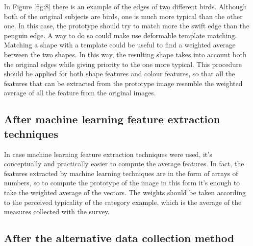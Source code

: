\documentclass[conference]{IEEEtran}
\begin{document}
		\noindent In Figure \ref{fig:8} there is an example of the edges of two different birds. Although both of the original 
		subjects are birds, one is much more typical than the other one. In this case, the prototype should try to match more the swift edge than the penguin edge. A way to do so could make use deformable 
		template matching. Matching a shape with a template could be useful to find a weighted average between the two shapes. In this way, the resulting shape takes into account both the original edges while 
		giving priority to the one more typical.
		This procedure should be applied for both shape features and colour features, so that all the features that can be extracted from the prototype image resemble the weighted average of all the feature from 
		the original images. 

		\subsection{After machine learning feature extraction techniques\label{sec:mlfet}}
		
			\noindent In case machine learning feature extraction techniques were used, it's conceptually and practically easier to compute the average features. In fact, the features extracted by machine learning techniques are 
			in the form of arrays of numbers, so to compute the prototype of the image in this form it's enough to take the weighted average of the vectors. The weights should be taken according to the perceived typicality 
			of the category example, which is the average of the measures collected with the survey.
			
		\subsection{After the alternative data collection method}
		
\end{document}
